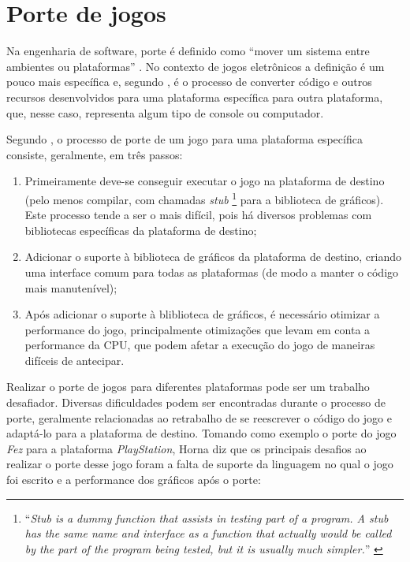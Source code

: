 \section{Porte de jogos}

Na engenharia de software, porte é definido como ``mover um sistema entre ambientes ou plataformas'' \cite{frakes}. No contexto de jogos eletrônicos a definição é um pouco mais específica e, segundo , é o processo de converter código e outros recursos desenvolvidos para uma plataforma específica para outra plataforma, que, nesse caso, representa algum tipo de console ou computador.

Segundo , o processo de porte de um jogo para uma plataforma específica consiste, geralmente, em três passos:

\begin{enumerate}
  \item Primeiramente deve-se conseguir executar o jogo na plataforma de destino (pelo menos compilar, com chamadas \textit{stub} \footnote{``\textit{Stub is a dummy function that assists in testing part of a program. A stub has the same name and interface as a function that actually would be called by the part of the program being tested, but it is usually much simpler.}'' \cite{dale}} para a biblioteca de gráficos). Este processo tende a ser o mais difícil, pois há diversos problemas com bibliotecas específicas da plataforma de destino;
  \item Adicionar o suporte à biblioteca de gráficos da plataforma de destino, criando uma interface comum para todas as plataformas (de modo a manter o código mais manutenível);
  \item Após adicionar o suporte à bliblioteca de gráficos, é necessário otimizar a performance do jogo, principalmente otimizações que levam em conta a performance da CPU, que podem afetar a execução do jogo de maneiras difíceis de antecipar.
\end{enumerate}

Realizar o porte de jogos para diferentes plataformas pode ser um trabalho desafiador. Diversas dificuldades podem ser encontradas durante o processo de porte, geralmente relacionadas ao retrabalho de se reescrever o código do jogo e adaptá-lo para a plataforma de destino. Tomando como exemplo o porte do jogo \textit{Fez} para a plataforma \textit{PlayStation}, Horna diz que os principais desafios ao realizar o porte desse jogo foram a falta de suporte da linguagem no qual o jogo foi escrito e a performance dos gráficos após o porte:

